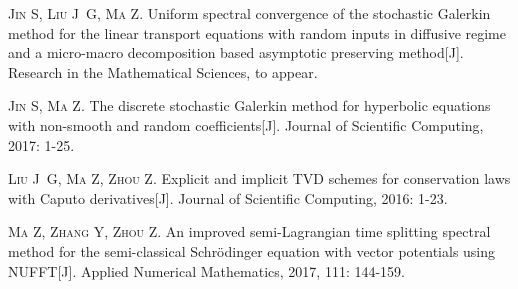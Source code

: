 
\begin{publications}{99}
  \item\textsc{Jin S, Liu J~G, Ma Z}. {Uniform spectral convergence of the stochastic Galerkin method for the linear transport equations with random inputs in diffusive regime and a micro-macro decomposition based asymptotic preserving method}[J]. Research in the Mathematical Sciences, to appear.
  \item\textsc{Jin S, Ma Z}. {The discrete stochastic Galerkin method for hyperbolic equations with non-smooth and random coefficients}[J]. Journal of Scientific Computing, 2017: 1-25.
  \item\textsc{Liu J~G, Ma Z, Zhou Z}. {Explicit and implicit TVD schemes for conservation laws with Caputo derivatives}[J]. Journal of Scientific Computing, 2016: 1-23.
  \item\textsc{Ma Z, Zhang Y, Zhou Z}. {An improved semi-Lagrangian time splitting spectral method for the semi-classical Schrödinger equation with vector potentials using NUFFT}[J]. Applied Numerical Mathematics, 2017, 111: 144-159.
\end{publications}
